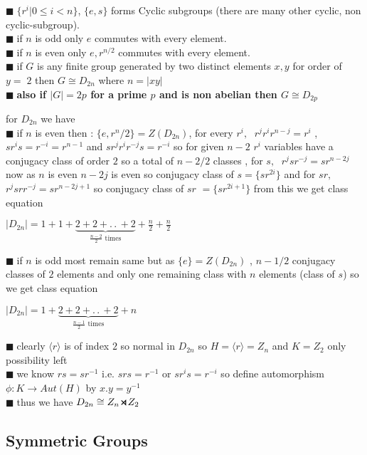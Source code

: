 \documentclass[11pt]{extarticle}
\newcommand{\ra}{\rightarrow}
\newcommand{\w}[1]{\text{#1}}
\newcommand{\ck}{.\,.\,}
\newcommand{\y}{$\blacksquare\;$}
\newcommand{\smdp}{ \,
\begin{tikzpicture}
	\draw[thick] (0,0)--(1ex,1ex)--(1ex,0)--(0,1ex);
\end{tikzpicture} 
\,
}
\newcommand{\gen}[1]{\langle #1 \rangle}
\newcommand{\tbx}[2][]{
	\begin{tcolorbox}[enhanced,breakable,size=small,colback=black!2!white,title={#1},arc is angular, arc=1.5mm,drop fuzzy shadow]
		#2
	\end{tcolorbox}
}
\begin{document}
\begin{multicols}{2}
	\tbx[Properties of $D_{2n}$ ]{
			\y  $\{r^i|0\leq i<n\}$, $\{e,s\}$ forms Cyclic subgroups (there are many other cyclic,  
			non cyclic-subgroup).\\
			\y  if $n$ is odd only $e$ commutes with every element. \\
			\y  if $n$ is even only $e,r^{n/2}$ commutes with every element. \\
			\y  if $G$ is any finite group generated by two distinct elements $x,y$ for order of $ y =\;2$ then $G\cong D_{2n}$ where $n=|xy|$ \\
			\y \textbf{also if $ |G|=2p $ for a prime $ p $ and is non abelian then $ G\cong D_{2p} $  }}

\tbx[Class equation]{ for $ D_{2n} $ we have \\
\y if $ n $ is even then : $ \{e,r^n/2\}=Z(D_{2n}) $, for every $ r^i,\; $ $ r^j r^i r^{n-j}=r^i $ , $ sr^is=r^{-i}=r^{n-1} $ and $ sr^jr^i r^{-j}s=r^{-i} $ so for given $ n-2 $ $ r^i $ variables have a conjugacy class of order $ 2 $ so a total of $ n-2/2 $ classes , for $ s,\; $ $ r^jsr^{-j}=sr^{n-2j} $ now as $ n $ is even $ n-2j $ is even so conjugacy class of $ s  =\{sr^{2i}\} $ and for $ sr,\;$ $ r^jsrr^{-j} =sr^{n-2j+1}$ so conjugacy class of $ sr $ $ =\{sr^{2i+1}\} $ from this we get class equation
\begin{center}
	$ |D_{2n}|=1+1 +\underbrace{2+2+\ck+2}_{\frac{ n-2 }{2} \w{ times}}+\frac{ n }{2} +\frac{ n }{2} $
	\end{center}   
\y if $ n $ is odd most remain same but  as $ \{e\}=Z(D_{2n}) $ , $ n-1/2 $ conjugacy classes of $2$ elements and only one remaining class with $ n $  elements (class of $ s $) so we get class equation
\begin{center}
	$ |D_{2n}|=1+\underbrace{2+2+\ck+2}_{\frac{ n-1 }{2} \w{ times}}+{ n }$
\end{center}   
}
\tbx[Semi direct product construction of $ D_{2n}=H\smdp K $  ]{ \y clearly $ \gen{r} $ is of index $ 2 $ so normal in $ D_{2n} $ so $ H=\gen{r}= Z_n$ and $ K=Z_2 $ only possibility left\\
\y  we know $ rs=sr^{-1} $ i.e. $ srs=r^{-1} $ or $ sr^is=r^{-i} $ so define automorphism $ \phi : K\ra Aut(H)  $ by $x.y=y^{-1}  $ \\
\y thus we have $ D_{2n}\cong Z_n\smdp Z_2 $ }
	\subsection{Symmetric Groups}
	

\end{multicols}
\end{document}
